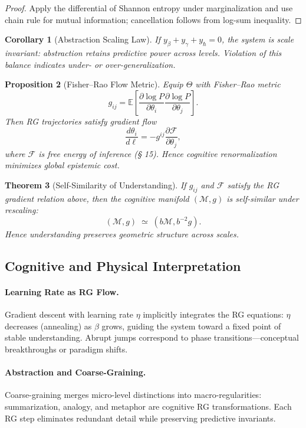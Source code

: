 \documentclass[12pt,a4paper,twoside,openright]{book}
\newtheorem{theorem}{Theorem}
\newtheorem{proposition}[theorem]{Proposition}
\newtheorem{corollary}[theorem]{Corollary}
\begin{document}
\begin{proof}
Apply the differential of Shannon entropy under marginalization and use chain rule for mutual information; cancellation follows from log-sum inequality.
\end{proof}

\begin{corollary}[Abstraction Scaling Law]
If \(y_\beta + y_\gamma + y_\hbar = 0\), the system is scale invariant: abstraction retains predictive power across levels.
Violation of this balance indicates under- or over-generalization.
\end{corollary}

\begin{proposition}[Fisher–Rao Flow Metric]
Equip $\Theta$ with Fisher–Rao metric
\[
g_{ij} = \mathbb{E}\!\left[\frac{\partial\log P}{\partial\theta_i}
          \frac{\partial\log P}{\partial\theta_j}\right].
\]
Then RG trajectories satisfy gradient flow
\[
\frac{d\theta_i}{d\ell} = -g^{ij}\frac{\partial\mathcal{F}}{\partial\theta_j},
\]
where $\mathcal{F}$ is free energy of inference (§ 15).  
Hence cognitive renormalization minimizes global epistemic cost.
\end{proposition}

\begin{theorem}[Self-Similarity of Understanding]
If \(g_{ij}\) and \(\mathcal{F}\) satisfy the RG gradient relation above,  
then the cognitive manifold $(\mathcal{M},g)$ is self-similar under rescaling:
\[
(\mathcal{M},g)\;\simeq\; (b\mathcal{M}, b^{-2}g).
\]
Hence understanding preserves geometric structure across scales.
\end{theorem}

\subsection*{Cognitive and Physical Interpretation}

\paragraph{Learning Rate as RG Flow.}
Gradient descent with learning rate $\eta$ implicitly integrates the RG equations:  
$\eta$ decreases (annealing) as $\beta$ grows, guiding the system toward a fixed point of stable understanding.  
Abrupt jumps correspond to phase transitions—conceptual breakthroughs or paradigm shifts.

\paragraph{Abstraction and Coarse-Graining.}
Coarse-graining merges micro-level distinctions into macro-regularities: summarization, analogy, and metaphor are cognitive RG transformations.  
Each RG step eliminates redundant detail while preserving predictive invariants.
\end{document}
